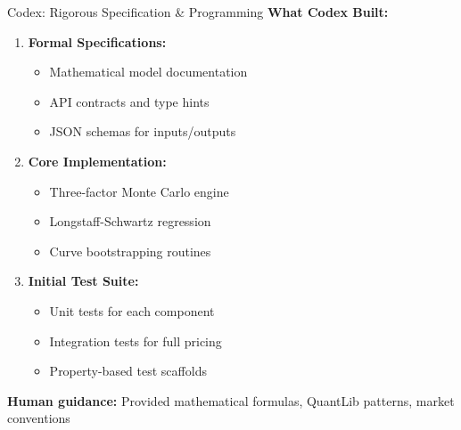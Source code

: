 \documentclass[aspectratio=169,11pt]{beamer}
\begin{document}
\begin{frame}{Codex: Rigorous Specification \& Programming}
\textbf{What Codex Built:}

\begin{enumerate}
    \item \textbf{Formal Specifications:}
    \begin{itemize}
        \item Mathematical model documentation
        \item API contracts and type hints
        \item JSON schemas for inputs/outputs
    \end{itemize}

    \item \textbf{Core Implementation:}
    \begin{itemize}
        \item Three-factor Monte Carlo engine
        \item Longstaff-Schwartz regression
        \item Curve bootstrapping routines
    \end{itemize}

    \item \textbf{Initial Test Suite:}
    \begin{itemize}
        \item Unit tests for each component
        \item Integration tests for full pricing
        \item Property-based test scaffolds
    \end{itemize}
\end{enumerate}

\textbf{Human guidance:} Provided mathematical formulas, QuantLib patterns, market conventions
\end{frame}
\end{document}
